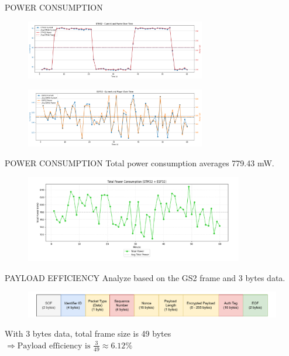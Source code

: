 \begin{frame}{POWER CONSUMPTION}
	\begin{figure}
		\centering
		\includegraphics[width=0.7\textwidth]{pic/stm32power.png}
	\end{figure}
	\begin{figure}
		\centering
		\includegraphics[width=0.7\textwidth]{pic/esp32power.png}
	\end{figure}
\end{frame}

\begin{frame}{POWER CONSUMPTION}
	Total power consumption averages 779.43 mW.
	\vspace{-0.2cm}
	\begin{figure}
		\centering
		\includegraphics[width=0.85\textwidth]{pic/power.pdf}
	\end{figure}
\end{frame}

\begin{frame}{PAYLOAD EFFICIENCY}
	Analyze based on the GS2 frame and 3 bytes data.
	\begin{figure}
		\centering
		\includegraphics[width=1\textwidth]{pic/gs2.pdf}
	\end{figure}
	With 3 bytes data, total frame size is 49 bytes
	$\Rightarrow \text{Payload efficiency is } \frac{3}{49} \approx 6.12\%$
\end{frame}

